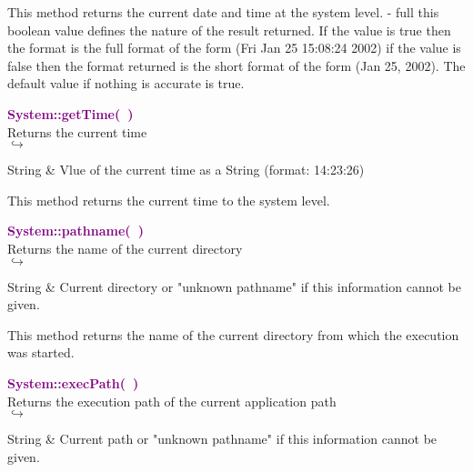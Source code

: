 \begin{tcolorbox}[width=\textwidth,myArgs,tabularx={ll|R}]

\end{tcolorbox}

This method returns the current date and time at the system level.
  - full this boolean value defines the nature of the result returned. If the value is true then the format is the full format of the form (Fri Jan 25 15:08:24 2002) if the value is false then the format returned is the short format of the form (Jan 25, 2002). The default value if nothing is accurate is true.

\textcolor{purple}{\textbf{System::getTime(~)}}\label{System::getTime()}\\
Returns the current time\\ \hspace*{5mm}$\hookrightarrow$
\vspace*{-2em}\begin{tcolorbox}[grow to left by=-1cm, width=\textwidth-1cm,myArgs,tabularx={l|R}]
String & Vlue of the current time as a String (format: 14:23:26)
\end{tcolorbox}

This method returns the current time to the system level.

\textcolor{purple}{\textbf{System::pathname(~)}}\label{System::pathname()}\\
Returns the name of the current directory\\ \hspace*{5mm}$\hookrightarrow$
\vspace*{-2em}\begin{tcolorbox}[grow to left by=-1cm, width=\textwidth-1cm,myArgs,tabularx={l|R}]
String & Current directory or "unknown pathname" if this information cannot be given.
\end{tcolorbox}

This method returns the name of the current directory from which the execution was started.

\textcolor{purple}{\textbf{System::execPath(~)}}\label{System::execPath()}\\
Returns the execution path of the current application path\\ \hspace*{5mm}$\hookrightarrow$
\vspace*{-2em}\begin{tcolorbox}[grow to left by=-1cm, width=\textwidth-1cm,myArgs,tabularx={l|R}]
String & Current path or "unknown pathname" if this information cannot be given.
\end{tcolorbox}

